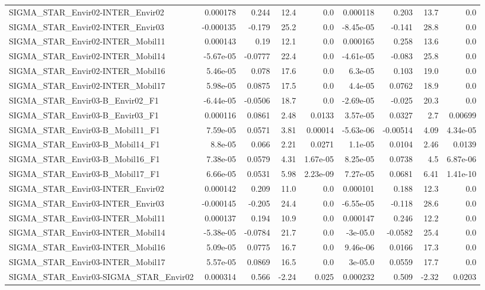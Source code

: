 \begin{tabular}{lrrrrrrrr}
SIGMA_STAR_Envir02-INTER_Envir02 & 0.000178 & 0.244 & 12.4 & 0.0 & 0.000118 & 0.203 & 13.7 & 0.0 \\
SIGMA_STAR_Envir02-INTER_Envir03 & -0.000135 & -0.179 & 25.2 & 0.0 & -8.45e-05 & -0.141 & 28.8 & 0.0 \\
SIGMA_STAR_Envir02-INTER_Mobil11 & 0.000143 & 0.19 & 12.1 & 0.0 & 0.000165 & 0.258 & 13.6 & 0.0 \\
SIGMA_STAR_Envir02-INTER_Mobil14 & -5.67e-05 & -0.0777 & 22.4 & 0.0 & -4.61e-05 & -0.083 & 25.8 & 0.0 \\
SIGMA_STAR_Envir02-INTER_Mobil16 & 5.46e-05 & 0.078 & 17.6 & 0.0 & 6.3e-05 & 0.103 & 19.0 & 0.0 \\
SIGMA_STAR_Envir02-INTER_Mobil17 & 5.98e-05 & 0.0875 & 17.5 & 0.0 & 4.4e-05 & 0.0762 & 18.9 & 0.0 \\
SIGMA_STAR_Envir03-B_Envir02_F1 & -6.44e-05 & -0.0506 & 18.7 & 0.0 & -2.69e-05 & -0.025 & 20.3 & 0.0 \\
SIGMA_STAR_Envir03-B_Envir03_F1 & 0.000116 & 0.0861 & 2.48 & 0.0133 & 3.57e-05 & 0.0327 & 2.7 & 0.00699 \\
SIGMA_STAR_Envir03-B_Mobil11_F1 & 7.59e-05 & 0.0571 & 3.81 & 0.00014 & -5.63e-06 & -0.00514 & 4.09 & 4.34e-05 \\
SIGMA_STAR_Envir03-B_Mobil14_F1 & 8.8e-05 & 0.066 & 2.21 & 0.0271 & 1.1e-05 & 0.0104 & 2.46 & 0.0139 \\
SIGMA_STAR_Envir03-B_Mobil16_F1 & 7.38e-05 & 0.0579 & 4.31 & 1.67e-05 & 8.25e-05 & 0.0738 & 4.5 & 6.87e-06 \\
SIGMA_STAR_Envir03-B_Mobil17_F1 & 6.66e-05 & 0.0531 & 5.98 & 2.23e-09 & 7.27e-05 & 0.0681 & 6.41 & 1.41e-10 \\
SIGMA_STAR_Envir03-INTER_Envir02 & 0.000142 & 0.209 & 11.0 & 0.0 & 0.000101 & 0.188 & 12.3 & 0.0 \\
SIGMA_STAR_Envir03-INTER_Envir03 & -0.000145 & -0.205 & 24.4 & 0.0 & -6.55e-05 & -0.118 & 28.6 & 0.0 \\
SIGMA_STAR_Envir03-INTER_Mobil11 & 0.000137 & 0.194 & 10.9 & 0.0 & 0.000147 & 0.246 & 12.2 & 0.0 \\
SIGMA_STAR_Envir03-INTER_Mobil14 & -5.38e-05 & -0.0784 & 21.7 & 0.0 & -3e-05.0 & -0.0582 & 25.4 & 0.0 \\
SIGMA_STAR_Envir03-INTER_Mobil16 & 5.09e-05 & 0.0775 & 16.7 & 0.0 & 9.46e-06 & 0.0166 & 17.3 & 0.0 \\
SIGMA_STAR_Envir03-INTER_Mobil17 & 5.57e-05 & 0.0869 & 16.5 & 0.0 & 3e-05.0 & 0.0559 & 17.7 & 0.0 \\
SIGMA_STAR_Envir03-SIGMA_STAR_Envir02 & 0.000314 & 0.566 & -2.24 & 0.025 & 0.000232 & 0.509 & -2.32 & 0.0203 \\

\end{tabular}
